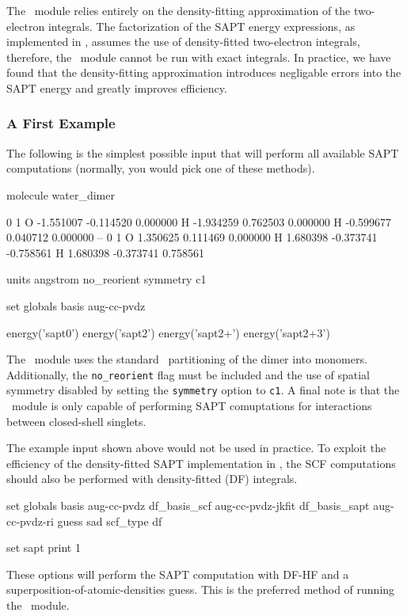The \PSIsapt\ module relies entirely on the density-fitting approximation
of the two-electron integrals. The factorization of the SAPT energy
expressions, as implemented in \PSIfour, assumes the use of density-fitted
two-electron integrals, therefore, the \PSIsapt\ module cannot be run with
exact integrals. In practice, we have found that the density-fitting
approximation introduces negligable errors into the SAPT energy and greatly
improves efficiency. 

\subsubsection{A First Example}

The following is the simplest possible input that will perform all
available SAPT computations (normally, you would pick one of these methods).
\begin{Snippet}

molecule water_dimer {
     0 1
     O  -1.551007  -0.114520   0.000000
     H  -1.934259   0.762503   0.000000
     H  -0.599677   0.040712   0.000000
     --
     0 1
     O   1.350625   0.111469   0.000000
     H   1.680398  -0.373741  -0.758561
     H   1.680398  -0.373741   0.758561

     units angstrom
     no_reorient
     symmetry c1
}

set globals {
    basis         aug-cc-pvdz
}

energy('sapt0')
energy('sapt2')
energy('sapt2+')
energy('sapt2+3')

\end{Snippet}
The \PSIsapt\ module uses the standard \PSIfour\ partitioning of the dimer
into monomers. Additionally, the \texttt{no\_reorient} flag must be included
and the use of spatial symmetry disabled by setting the \texttt{symmetry}
option to \texttt{c1}. A final note is that the \PSIsapt\ module is only 
capable of performing SAPT comuptations for interactions between closed-shell 
singlets. 

The example input shown above would not be used in practice.
To exploit the efficiency of the density-fitted SAPT implementation in
\PSIfour, the SCF computations should also be performed with density-fitted
(DF) integrals.
\begin{Snippet}

set globals {
    basis         aug-cc-pvdz
    df_basis_scf  aug-cc-pvdz-jkfit
    df_basis_sapt aug-cc-pvdz-ri
    guess         sad
    scf_type      df
}

set sapt {
    print         1
}

\end{Snippet}
These options will perform the SAPT computation with DF-HF and a 
superposition-of-atomic-densities guess. This is the preferred method of 
running the \PSIsapt\ module.

